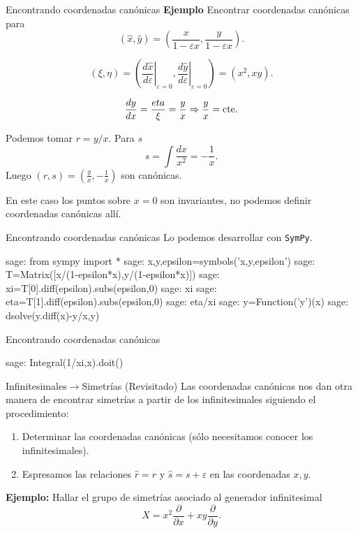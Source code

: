 \documentclass[handout,hyperref={colorlinks=true}]{beamer}
\renewcommand{\epsilon}{\varepsilon}
\begin{document}
\begin{frame}{Encontrando coordenadas canónicas}\label{pag:can_ejem_p}
\textbf{Ejemplo} Encontrar coordenadas canónicas para
\[(\hat{x},\hat{y})=\left( \frac{x}{1-\epsilon x},\frac{y}{1-\epsilon x}\right).\]

\[(\xi,\eta)=\left(\left.\frac{d\hat{x}}{d\epsilon}\right|_{\epsilon=0},\left.\frac{d\hat{y}}{d\epsilon}\right|_{\epsilon=0}\right)=(x^2,xy).\]

\[\frac{dy}{dx}=\frac{eta}{\xi}=\frac{y}{x}\Rightarrow \frac{y}{x}=\hbox{cte}.\]

Podemos tomar $r=y/x$. Para $s$
\[s=\int\frac{dx}{x^2}=-\frac{1}{x}.\]
Luego $(r,s)=(\frac{y}{x},-\frac{1}{x})$ son canónicas.



En este caso los puntos sobre $x=0$ son invariantes, no podemos definir coordenadas canónicas allí.


 
\end{frame}



\begin{frame}[fragile]{Encontrando coordenadas canónicas}
Lo podemos desarrollar con \texttt{SymPy}. 
\begin{sagecommandline}
sage: from sympy import *
sage: x,y,epsilon=symbols('x,y,epsilon')
sage: T=Matrix([x/(1-epsilon*x),y/(1-epsilon*x)])
sage: xi=T[0].diff(epsilon).subs(epsilon,0)
sage: xi
sage: eta=T[1].diff(epsilon).subs(epsilon,0)
sage: eta/xi
sage: y=Function('y')(x)
sage: dsolve(y.diff(x)-y/x,y)


\end{sagecommandline}
\end{frame}

\begin{frame}[fragile]{Encontrando coordenadas canónicas}
 
\begin{sagecommandline}
sage: Integral(1/xi,x).doit()

\end{sagecommandline}
\end{frame}




\begin{frame}{Infinitesimales$\to$Simetrías (Revisitado)}
Las coordenadas canónicas nos dan otra manera de encontrar simetrías a partir de los infinitesimales siguiendo el procedimiento:

\begin{enumerate}
\item<+-> Determinar las coordenadas canónicas  (sólo necesitamos conocer los infinitesimales).
\item<+-> Espresamos las relaciones $\hat{r}=r$ y $\hat{s}=s+\epsilon$ en las coordenadas $x,y$. 
\end{enumerate}


\textbf{Ejemplo:} Hallar el grupo de simetrías asociado al generador infinitesimal
\[X=x^2\frac{\partial}{\partial x}+xy\frac{\partial}{\partial y}.\]
\end{frame}
\end{document}

